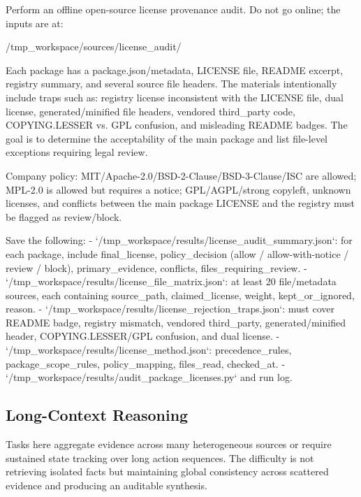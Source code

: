 \begin{clawcode}[title={\texttt{task\_18\_license\_provenance\_audit}}]
Perform an offline open-source license provenance audit. Do not go
online; the inputs are at:

    /tmp_workspace/sources/license_audit/

Each package has a package.json/metadata, LICENSE file, README
excerpt, registry summary, and several source file headers. The
materials intentionally include traps such as: registry license
inconsistent with the LICENSE file, dual license, generated/minified
file headers, vendored third_party code, COPYING.LESSER vs. GPL
confusion, and misleading README badges. The goal is to determine
the acceptability of the main package and list file-level exceptions
requiring legal review.

Company policy: MIT/Apache-2.0/BSD-2-Clause/BSD-3-Clause/ISC are
allowed; MPL-2.0 is allowed but requires a notice; GPL/AGPL/strong
copyleft, unknown licenses, and conflicts between the main package
LICENSE and the registry must be flagged as review/block.

Save the following:
- `/tmp_workspace/results/license_audit_summary.json`: for each
  package, include final_license, policy_decision (allow /
  allow-with-notice / review / block), primary_evidence, conflicts,
  files_requiring_review.
- `/tmp_workspace/results/license_file_matrix.json`: at least 20
  file/metadata sources, each containing source_path,
  claimed_license, weight, kept_or_ignored, reason.
- `/tmp_workspace/results/license_rejection_traps.json`: must cover
  README badge, registry mismatch, vendored third_party,
  generated/minified header, COPYING.LESSER/GPL confusion, and
  dual license.
- `/tmp_workspace/results/license_method.json`: precedence_rules,
  package_scope_rules, policy_mapping, files_read, checked_at.
- `/tmp_workspace/results/audit_package_licenses.py` and run log.
\end{clawcode}

\subsection{Long-Context Reasoning}\label{app:examples:long-context}

Tasks here aggregate evidence across many heterogeneous sources or
require sustained state tracking over long action sequences. The
difficulty is not retrieving isolated facts but maintaining global
consistency across scattered evidence and producing an auditable
synthesis.

